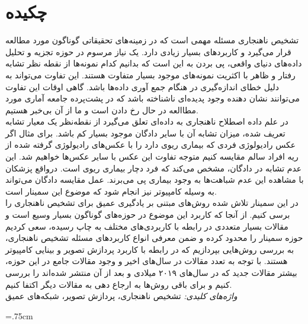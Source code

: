 \documentclass[12pt,a4paper]{report}
\newcommand*{\BeginNoToc}{%
  \addtocontents{toc}{%
    \edef\protect\SavedTocDepth{\protect\the\protect\value{tocdepth}}%
  }%
  \addtocontents{toc}{%
    \protect\setcounter{tocdepth}{-10}%
  }%
}
\newcommand*{\EndNoToc}{%
  \addtocontents{toc}{%
    \protect\setcounter{tocdepth}{\protect\SavedTocDepth}%
  }%
}
\theoremstyle{definition}
\theoremstyle{definition}
\begin{document}
	
	\chapter*{چکیده}
	تشخیص ناهنجاری‌ مسئله مهمی است که در زمینه‌های تحقیقاتی گوناگون مورد مطالعه قرار می‌گیرد و کاربرد‌های بسیار زیادی دارد. یک نیاز مرسوم در حوزه تجزیه و تحلیل داده‌های دنیای واقعی، پی بردن به این است که بدانیم کدام نمونه‌ها از نقطه نظر تشابه رفتار و ظاهر با اکثریت نمونه‌های موجود بسیار متفاوت هستند. این تفاوت می‌تواند به دلیل خطای انداز‌ه‌گیری در هنگام جمع آوری داده‌ها باشد. گاهی اوقات این تفاوت می‌توانند نشان‌ دهنده وجود پدیده‌ای ناشناخته‌ باشد که در پشت‌پرده جامعه آماری مورد مطاالعه در حال رخ دادن است و ما از آن بی‌خبر هستیم. \\

در علم داده اصطلاح ناهنجاری به داده‌ای تعلق می‌گیرد از نقطه‌نظر یک معیار تشابه تعریف شده، میزان تشابه آن با سایر دادگان موجود بسیار کم باشد. برای مثال اگر عکس رادیولوژی فردی که بیماری ریوی دارد را با عکس‌های رادیولوژی گرفته شده از ریه افراد سالم مقایسه کنیم متوجه تفاوت این عکس با سایر عکس‌ها خواهیم شد. این عدم تشابه در دادگان، مشخص می‌کند  که فرد دچار بیماری ریوی است. درواقع پزشکان با مشاهده این عدم شباهت‌ها به وجود بیماری پی می‌برند. عمل مقایسه دادگان می‌تواند به وسیله کامپیوتر نیز انجام شود که موضوع این سمینار است.\\

در این سمینار تلاش شده روش‌های مبتنی بر یادگیری عمیق برای تشخیص ناهنجاری را برسی کنیم. از آنجا که کاربرد این موضوع در حوزه‌های گوناگون بسیار وسیع است و مقالات بسیار متعددی در رابطه با کاربردی‌های مختلف به چاپ رسیده، سعی کردیم حوزه سمینار را محدود کرده و ضمن معرفی انواع کاربرد‌های مسئله تشخیص ناهنجاری، به بررسی روش‌هایی بپردازیم که در رابطه با کاربرد پردازش تصویر و بینایی کامپیوتر هستند. با توجه به تعدد مقالات در سال‌های اخیر و وجود مقالات جامع در این حوزه، بیشتر مقالات جدید که در سال‌های  ۲۰۱۹ میلادی و بعد از آن منتشر شده‌اند را بررسی کنیم و برای باقی روش‌ها به ارجاع دهی به مقالات دیگر اکتفا کنیم.\\

	\textit{
واژه‌های کلیدی:
	}
	تشخیص ناهنجاری، پردازش تصویر، شبکه‌های عمیق

	\newpage
	\baselineskip=1cm
	\BeginNoToc
	\tableofcontents
	\listoffigures
	\listoftables
	\EndNoToc
	
	\newpage
	
	\baselineskip=.75cm
\end{document}

